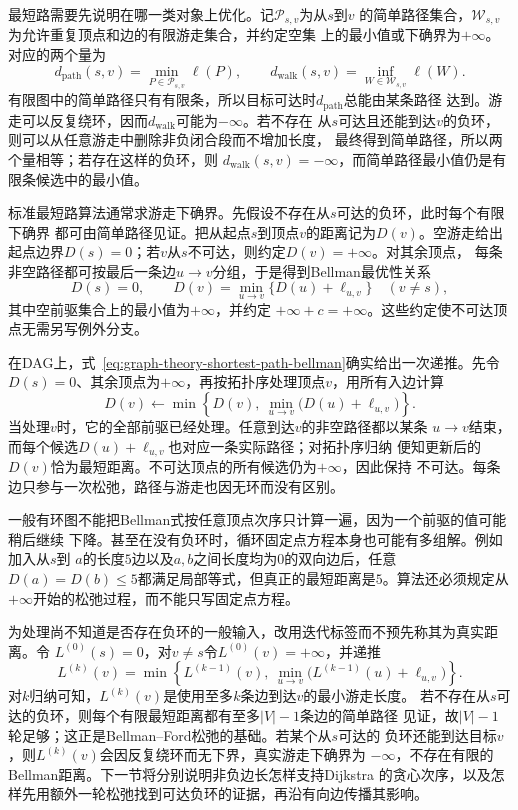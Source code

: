 最短路需要先说明在哪一类对象上优化。记\(\mathcal{P}_{s,v}\)为从\(s\)到\(v\)
的简单路径集合，\(\mathcal{W}_{s,v}\)为允许重复顶点和边的有限游走集合，并约定空集
上的最小值或下确界为\(+\infty\)。对应的两个量为
\[
  d_{\mathrm{path}}(s,v)
  =\min_{P\in\mathcal{P}_{s,v}}\ell(P),
  \qquad
  d_{\mathrm{walk}}(s,v)
  =\inf_{W\in\mathcal{W}_{s,v}}\ell(W).
\]
有限图中的简单路径只有有限条，所以目标可达时\(d_{\mathrm{path}}\)总能由某条路径
达到。游走可以反复绕环，因而\(d_{\mathrm{walk}}\)可能为\(-\infty\)。若不存在
从\(s\)可达且还能到达\(v\)的负环，则可以从任意游走中删除非负闭合段而不增加长度，
最终得到简单路径，所以两个量相等；若存在这样的负环，则
\(d_{\mathrm{walk}}(s,v)=-\infty\)，而简单路径最小值仍是有限条候选中的最小值。

标准最短路算法通常求游走下确界。先假设不存在从\(s\)可达的负环，此时每个有限下确界
都可由简单路径见证。把从起点\(s\)到顶点\(v\)的距离记为\(D(v)\)。空游走给出
起点边界\(D(s)=0\)；若\(v\)从\(s\)不可达，则约定\(D(v)=+\infty\)。对其余顶点，
每条非空路径都可按最后一条边\(u\to v\)分组，于是得到Bellman最优性关系
\begin{equation}
  D(s)=0,\qquad
  D(v)=\min_{u\to v}\{D(u)+\ell_{u,v}\}\quad(v\neq s),
  \label{eq:graph-theory-shortest-path-bellman}
\end{equation}
其中空前驱集合上的最小值为\(+\infty\)，并约定
\(+\infty+c=+\infty\)。这些约定使不可达顶点无需另写例外分支。

在DAG上，式~\eqref{eq:graph-theory-shortest-path-bellman}确实给出一次递推。先令
\(D(s)=0\)、其余顶点为\(+\infty\)，再按拓扑序处理顶点\(v\)，用所有入边计算
\[
  D(v)\leftarrow
  \min\left\{D(v),\ \min_{u\to v}\bigl(D(u)+\ell_{u,v}\bigr)\right\}.
\]
当处理\(v\)时，它的全部前驱已经处理。任意到达\(v\)的非空路径都以某条
\(u\to v\)结束，而每个候选\(D(u)+\ell_{u,v}\)也对应一条实际路径；对拓扑序归纳
便知更新后的\(D(v)\)恰为最短距离。不可达顶点的所有候选仍为\(+\infty\)，因此保持
不可达。每条边只参与一次松弛，路径与游走也因无环而没有区别。

一般有环图不能把Bellman式按任意顶点次序只计算一遍，因为一个前驱的值可能稍后继续
下降。甚至在没有负环时，循环固定点方程本身也可能有多组解。例如加入从\(s\)到
\(a\)的长度\(5\)边以及\(a,b\)之间长度均为\(0\)的双向边后，任意
\(D(a)=D(b)\leq5\)都满足局部等式，但真正的最短距离是\(5\)。算法还必须规定从
\(+\infty\)开始的松弛过程，而不能只写固定点方程。

为处理尚不知道是否存在负环的一般输入，改用迭代标签而不预先称其为真实距离。令
\(L^{(0)}(s)=0\)，对\(v\neq s\)令\(L^{(0)}(v)=+\infty\)，并递推
\[
  L^{(k)}(v)=
  \min\left\{
    L^{(k-1)}(v),\
    \min_{u\to v}\bigl(L^{(k-1)}(u)+\ell_{u,v}\bigr)
  \right\}.
\]
对\(k\)归纳可知，\(L^{(k)}(v)\)是使用至多\(k\)条边到达\(v\)的最小游走长度。
若不存在从\(s\)可达的负环，则每个有限最短距离都有至多\(|V|-1\)条边的简单路径
见证，故\(|V|-1\)轮足够；这正是Bellman--Ford松弛的基础。若某个从\(s\)可达的
负环还能到达目标\(v\)，则\(L^{(k)}(v)\)会因反复绕环而无下界，真实游走下确界为
\(-\infty\)，不存在有限的Bellman距离。下一节将分别说明非负边长怎样支持Dijkstra
的贪心次序，以及怎样先用额外一轮松弛找到可达负环的证据，再沿有向边传播其影响。

